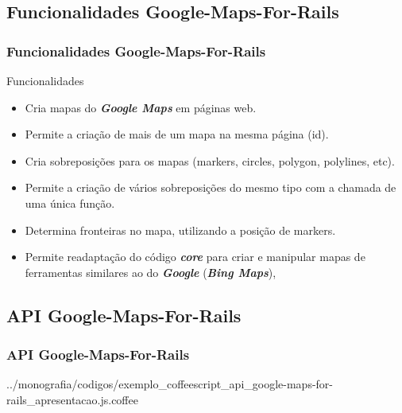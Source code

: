 \subsection{Funcionalidades Google-Maps-For-Rails}
\begin{frame}
 \frametitle{Funcionalidades Google-Maps-For-Rails}

  \begin{block}{Funcionalidades}   

   \begin{itemize}

    \item  Cria mapas do \emph{\textbf{Google Maps}} em páginas web.

    \item  Permite a criação de mais de um mapa na mesma página (id).

    \item  Cria sobreposições para os mapas (markers, circles, polygon, polylines, etc).

    \item  Permite a criação de vários sobreposições do mesmo tipo com a chamada de uma única função.

    \item  Determina fronteiras no mapa, utilizando a posição de markers.

    \item  Permite readaptação do código \emph{\textbf{core}} para criar e manipular mapas de ferramentas
    similares ao do \emph{\textbf{Google}} (\emph{\textbf{Bing Maps}}),

   \end{itemize}

  \end{block}

\end{frame}


\subsection{API Google-Maps-For-Rails}
\begin{frame}
 \frametitle{API Google-Maps-For-Rails}

      
      {../monografia/codigos/exemplo_coffeescript_api_google-maps-for-rails_apresentacao.js.coffee}

\end{frame}


